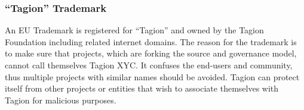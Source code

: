 \subsubsection{“Tagion” Trademark}
An EU Trademark is registered for “Tagion” and owned by the Tagion Foundation including related internet domains. 
The reason for the trademark is to make sure that projects, which are forking the source and governance model, cannot call themselves Tagion XYC. It confuses the end-users and community, thus multiple projects with similar names should be avoided.
Tagion can protect itself from other projects or entities that wish to associate themselves with Tagion for malicious purposes.
